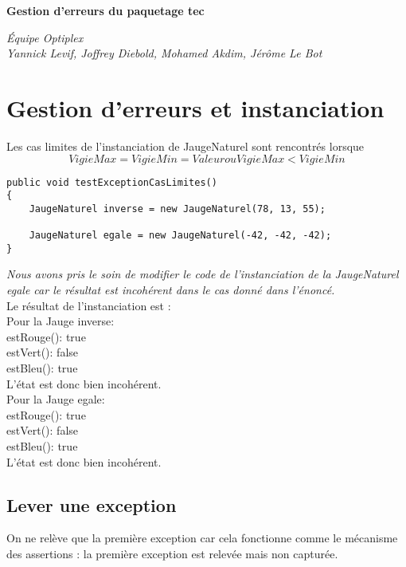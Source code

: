 \documentclass[12pt,a4paper]{article}
\begin{document}
\begin{center}
\huge{\textbf{Gestion d’erreurs du paquetage tec}}
\end{center}

\begin{flushleft}
\emph{\'Equipe Optiplex \\ Yannick Levif, Joffrey Diebold, Mohamed Akdim, Jérôme Le Bot}
\end{flushleft}
\section{Gestion d’erreurs et instanciation}

Les cas limites de l'instanciation de JaugeNaturel sont rencontrés lorsque \[VigieMax = VigieMin = Valeur ou   VigieMax < VigieMin\]
\begin{verbatim}
public void testExceptionCasLimites() 
{ 
	JaugeNaturel inverse = new JaugeNaturel(78, 13, 55);
	 
	JaugeNaturel egale = new JaugeNaturel(-42, -42, -42); 
}
\end{verbatim}

\noindent\textit{Nous avons pris le soin de modifier le code de l'instanciation de la JaugeNaturel egale car le résultat est incohérent dans le cas donné dans l'énoncé.}\\

Le résultat de l'instanciation est : \\
Pour la Jauge inverse: \\
estRouge(): true\\
estVert(): false\\
estBleu(): true\\
L'état est donc bien incohérent.\\

Pour la Jauge egale:\\
estRouge(): true\\
estVert(): false\\
estBleu(): true\\
L'état est donc bien incohérent.\\

\subsection{Lever une exception}

On ne relève que la première exception car cela fonctionne comme le mécanisme des assertions : la première exception est relevée mais non capturée.
\end{document}
